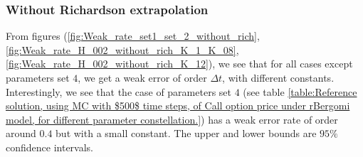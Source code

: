 \FloatBarrier


\subsubsection{Without Richardson extrapolation}
From figures (\ref{fig:Weak_rate_set1_set_2_without_rich},\ref{fig:Weak_rate_H_002_without_rich_K_1_K_08},\ref{fig:Weak_rate_H_002_without_rich_K_12}), we see that for all cases  except parameters set $4$, we get a weak error of order $\Delta t$, with different  constants. Interestingly, we see that the case of parameters set $4$ (see table \ref{table:Reference solution, using MC with $500$ time steps, of Call option price under rBergomi model, for different parameter constellation.}) has a weak error rate of order around $0.4$ but with a small constant. The upper and lower bounds are $95\%$ confidence intervals.

